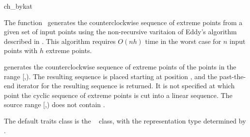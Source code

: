 
\begin{ccRefFunction}{ch_bykat}  

\ccDefinition
  
The function \ccRefName\ generates the counterclockwise sequence of extreme
points from a given set of input points using the non-recursive varitaion of
Eddy's algorithm \cite{e-nchap-77} described in \cite{b-chfsp-78}.
This algorithm requires $O(n h)$ time 
in the worst case for $n$ input points with $h$ extreme points.  


            {generates the counterclockwise sequence of extreme points
            of the points in the range [,).
            The resulting sequence is placed starting at position
            , and the past-the-end iterator for the resulting
            sequence is returned. It is not specified at which point the
            cyclic sequence of extreme points is cut into a linear sequence.
            \ccPrecond %
            The source range [,) does not contain
            .}

The default traits class  is the \cgal\
 class,
with the representation type determined by .



\end{ccRefFunction}
